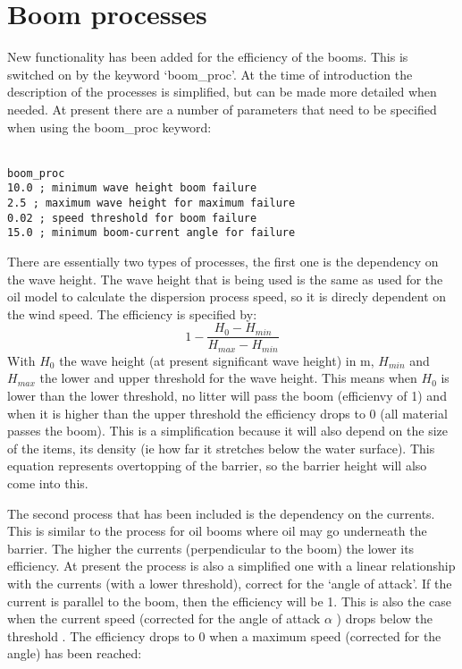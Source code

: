 \documentclass[english]{deltares_manual}
\begin{document}
\section{Boom processes}
New functionality has been added for the efficiency of the booms. This is switched on by the keyword ‘boom\_proc’. At the time of introduction the description of the processes is simplified, but can be made more detailed when needed. At present there are a number of parameters that need to be specified when using the boom\_proc keyword:
\begin{tcolorbox}
	\footnotesize
	\texttt{\\
boom\_proc\\
10.0    ; minimum wave height boom failure\\
2.5    ; maximum wave height for maximum failure\\
0.02   ; speed threshold for boom failure\\
15.0   ; minimum boom-current angle for failure\\
}
\end{tcolorbox}
There are essentially two types of processes, the first one is the dependency on the wave height. The wave height that is being used is the same as used for the oil model to calculate the dispersion process speed, so it is direcly dependent on the wind speed. 
The efficiency is specified by:
\begin{equation}\label{eq:boomeff}
1-\frac{H_{0} - H_{min}}{H_{max}-H_{min}}
\end{equation}
With $H_{0}$ the wave height (at present significant wave height) in m, $H_{min}$  and $H_{max}$ the lower and upper threshold for the wave height. This means when $H_{0}$ is lower than the lower threshold, no litter will pass the boom (efficienvy of 1) and when it is higher than the upper threshold the efficiency drops to 0 (all material passes the boom). This is a simplification because it will also depend on the size of the items, its density (ie how far it stretches below the water surface). This equation represents overtopping of the barrier, so the barrier height will also come into this.

The second process that has been included is the dependency on the currents. This is similar to the process for oil booms where oil may go underneath the barrier. The higher the currents (perpendicular to the boom) the lower its efficiency. At present the process is also a simplified one with a linear relationship with the currents (with a lower threshold), correct for the ‘angle of attack’. If the current is parallel to the boom, then the efficiency will be 1. This is also the case when the current speed (corrected for the angle of attack $\alpha$  ) drops below the threshold  . The efficiency drops to 0 when a maximum speed (corrected for the angle) has been reached:
\end{document}
